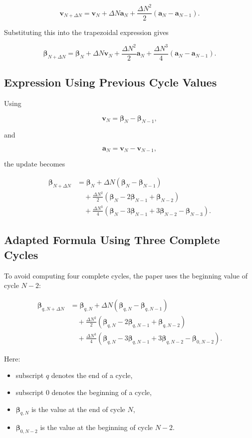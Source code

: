 ﻿\documentclass[11pt,a4paper]{article}
\begin{document}
\[
\bm{v}_{N+\Delta N}
=
\bm{v}_N
+
\Delta N\bm{a}_N
+
\frac{\Delta N^2}{2}
(\bm{a}_N-\bm{a}_{N-1}).
\]

Substituting this into the trapezoidal expression gives

\[
\bm{\beta}_{N+\Delta N}
=
\bm{\beta}_N
+
\Delta N\bm{v}_N
+
\frac{\Delta N^2}{2}\bm{a}_N
+
\frac{\Delta N^3}{4}
(\bm{a}_N-\bm{a}_{N-1}).
\]

\subsection{Expression Using Previous Cycle Values}

Using

\[
\bm{v}_N
=
\bm{\beta}_N-\bm{\beta}_{N-1},
\]

and

\[
\bm{a}_N
=
\bm{v}_N-\bm{v}_{N-1},
\]

the update becomes

\[
\begin{aligned}
\bm{\beta}_{N+\Delta N}
&=
\bm{\beta}_N
+
\Delta N
(\bm{\beta}_N-\bm{\beta}_{N-1}) \\
&\quad
+
\frac{\Delta N^2}{2}
(\bm{\beta}_N-2\bm{\beta}_{N-1}+\bm{\beta}_{N-2}) \\
&\quad
+
\frac{\Delta N^3}{4}
(\bm{\beta}_N-3\bm{\beta}_{N-1}+3\bm{\beta}_{N-2}-\bm{\beta}_{N-3}).
\end{aligned}
\]

\subsection{Adapted Formula Using Three Complete Cycles}

To avoid computing four complete cycles, the paper uses the beginning value of cycle $N-2$:

\[
\begin{aligned}
\bm{\beta}_{q,N+\Delta N}
&=
\bm{\beta}_{q,N}
+
\Delta N
(\bm{\beta}_{q,N}-\bm{\beta}_{q,N-1}) \\
&\quad
+
\frac{\Delta N^2}{2}
(\bm{\beta}_{q,N}-2\bm{\beta}_{q,N-1}+\bm{\beta}_{q,N-2}) \\
&\quad
+
\frac{\Delta N^3}{4}
(\bm{\beta}_{q,N}-3\bm{\beta}_{q,N-1}+3\bm{\beta}_{q,N-2}-\bm{\beta}_{0,N-2}).
\end{aligned}
\]

Here:

\begin{itemize}[leftmargin=*]
    \item subscript $q$ denotes the end of a cycle,
    \item subscript $0$ denotes the beginning of a cycle,
    \item $\bm{\beta}_{q,N}$ is the value at the end of cycle $N$,
    \item $\bm{\beta}_{0,N-2}$ is the value at the beginning of cycle $N-2$.
\end{itemize}
\end{document}
